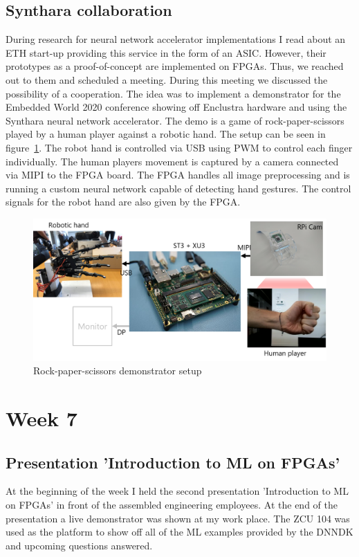 \subsection{Synthara collaboration}
During research for neural network accelerator implementations I read about an ETH start-up providing this service in the form of an \ac{ASIC}. However, their prototypes as a proof-of-concept are implemented on \acp{FPGA}. Thus, we reached out to them and scheduled a meeting. During this meeting we discussed the possibility of a cooperation. The idea was to implement a demonstrator for the Embedded World 2020 conference showing off Enclustra hardware and using the Synthara neural network accelerator. The demo is a game of rock-paper-scissors played by a human player against a robotic hand. The setup can be seen in figure~\ref{fig:demonstrator}. The robot hand is controlled via \ac{USB} using \ac{PWM} to control each finger individually. The human players movement is captured by a camera connected via \ac{MIPI} to the \ac{FPGA} board. The \ac{FPGA} handles all image preprocessing and is running a custom neural network capable of detecting hand gestures. The control signals for the robot hand are also given by the FPGA.
	\begin{figure}[!htb]
	\centering
		\includegraphics[width=\textwidth]{bilder/demonstrator.png}
		\caption{Rock-paper-scissors demonstrator setup}
		\label{fig:demonstrator}
	\end{figure}

\section{Week 7}
\subsection{Presentation 'Introduction to \ac{ML} on \acp{FPGA}'}
At the beginning of the week I held the second presentation 'Introduction to \ac{ML} on \acp{FPGA}' in front of the assembled engineering employees. At the end of the presentation a live demonstrator was shown at my work place. The ZCU 104 was used as the platform to show off all of the \ac{ML} examples provided by the \ac{DNNDK} and upcoming questions answered. 
